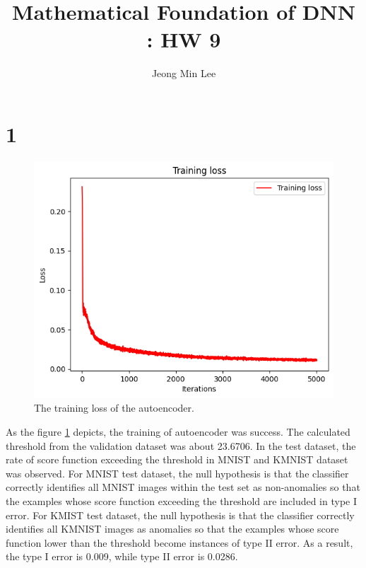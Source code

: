 \documentclass[10pt]{article}
\title{\textbf{Mathematical Foundation of DNN : HW 9}}
\author{Jeong Min Lee}
\begin{document}
\maketitle

\section*{1}

\begin{figure}[!h]
    \begin{center}
        \includegraphics[scale = 0.5]{fig/fig1.png}
    \end{center}
    \caption{The training loss of the autoencoder. }
    \label{fig1}
\end{figure}

As the figure \ref{fig1} depicts, the training of autoencoder was success. 
The calculated threshold from the validation dataset was about 23.6706.
In the test dataset, the rate of score function exceeding the threshold in MNIST and KMNIST dataset was observed.
For MNIST test dataset, the null hypothesis is that the classifier correctly identifies all MNIST images within the test set as non-anomalies so that the examples whose score function exceeding the threshold are included in type I error. 
For KMIST test dataset, the null hypothesis is that the classifier correctly identifies all KMNIST images as anomalies so that the examples whose score function lower than the threshold become instances of type II error. 
As a result, the type I error is 0.009, while type II error is 0.0286. 
\end{document}
